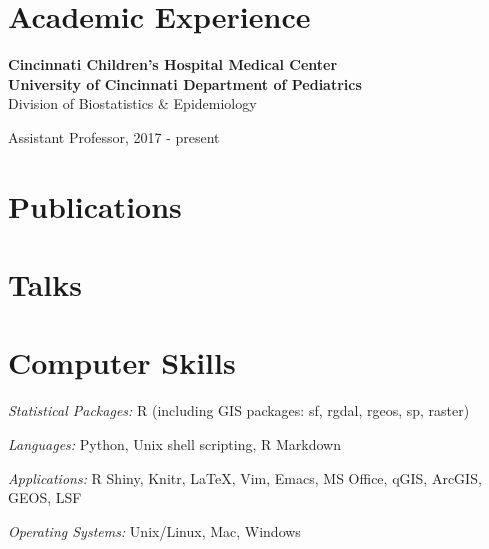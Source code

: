 \documentclass[margin,line]{res}
\newenvironment{list1}{
  \begin{list}{\ding{113}}{%
      \setlength{\itemsep}{0in}
      \setlength{\parsep}{0in} \setlength{\parskip}{0in}
      \setlength{\topsep}{0in} \setlength{\partopsep}{0in}
      \setlength{\leftmargin}{0.17in}}}{\end{list}}
\newenvironment{list3}{
  \begin{list}{}{%
      \setlength{\itemsep}{0in}
      \setlength{\parsep}{0in} \setlength{\parskip}{0in}
      \setlength{\topsep}{0in} \setlength{\partopsep}{0in}
      \setlength{\leftmargin}{0in}}}{\end{list}}
\begin{document}
\begin{resume}
\section{\sc Academic Experience}

{\bf Cincinnati Children's Hospital Medical Center}\\
{\bf University of Cincinnati Department of Pediatrics}\\
Division of Biostatistics \& Epidemiology\\
\vspace*{-.1in}
\begin{list1}
    \item[] Assistant Professor, 2017 - present
\end{list1}



\section{\sc Publications}


\section{\sc Talks}


\section{\sc Computer Skills}

\begin{list3} \itemsep 4pt
\item[] \textit{Statistical Packages:}  R (including GIS packages: sf, rgdal, rgeos, sp, raster)
\item[] \textit{Languages:} Python, Unix shell scripting, R Markdown
\item[] \textit{Applications:} R Shiny, Knitr, \LaTeX, Vim, Emacs, MS Office, qGIS, ArcGIS, GEOS, LSF
\item[] \textit{Operating Systems:}  Unix/Linux, Mac, Windows\\
\end{list3}


\end{resume}
\end{document}
